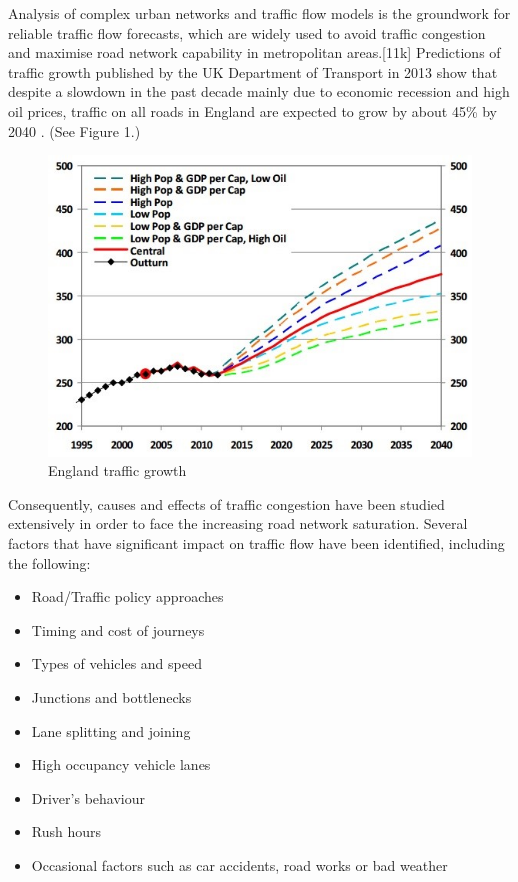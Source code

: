 \documentclass[11pt]{article}
\begin{document}
Analysis of complex urban networks and traffic flow models is the groundwork for reliable traffic flow forecasts, which are widely used to avoid traffic congestion and maximise road network capability in metropolitan areas.[11k] Predictions of traffic growth published by the UK Department of Transport in 2013 show that despite a slowdown in the past decade mainly due to economic recession and high oil prices, traffic on all roads in England are expected to grow by about 45\% by 2040 \cite{10j}. (See Figure 1.)

\begin{figure}[h]
\begin{center}
\includegraphics[scale=0.7]{england_traffic}
\caption{England traffic growth}
\end{center}
\end{figure}


Consequently, causes and effects of traffic congestion have been studied extensively in order to face the increasing road network saturation. Several factors that have significant impact on traffic flow have been identified, including the following: 
\begin{singlespace}
\begin{itemize}\itemsep0pt
\item Road/Traffic policy approaches
\item Timing and cost of journeys
\item Types of vehicles and speed
\item Junctions and bottlenecks
\item Lane splitting and joining
\item High occupancy vehicle lanes
\item Driver\textquoteright s behaviour
\item Rush hours
\item Occasional factors such as car accidents, road works or bad weather
\end{itemize}
\end{singlespace}
\end{document}
